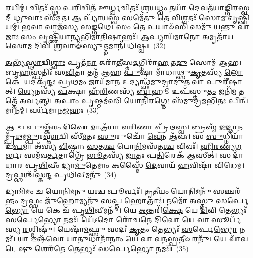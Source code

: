 \-\ul{𑌰}\-𑌯𑌿𑌮𑍍। 𑌚𑌿𑌤𑌃᳴ 𑌸𑍍𑌥 𑌪\-\ul{𑌰𑌿}\-𑌚𑌿𑌤᳴ 𑌊\-\ul{𑌰𑍍𑌧𑍍𑌵}\-𑌚𑌿𑌤𑌃᳴ 𑌶𑍍𑌰𑌯\-\ul{𑌧𑍍𑌵𑌂} 𑌤𑌯𑌾᳴ \ul{𑌦𑍇}\-𑌵𑌤᳴𑌯𑌾𑌙𑍍𑌗𑌿\-\ul{𑌰}\-𑌸𑍍𑌵𑌦𑍍 \ul{𑌧𑍍𑌰𑍁}\-𑌵𑌾𑌃 𑌸𑍀᳴𑌦𑌤। 𑌆 𑌪𑍍𑌯𑌾᳴𑌯\-\ul{𑌸𑍍𑌵} 𑌸𑌮𑍇᳴𑌤𑍁 𑌤𑍇 \ul{𑌵𑌿}\-𑌶𑍍𑌵𑌤𑌃᳴ 𑌸𑍋\-\ul{𑌮} 𑌵𑍃𑌷𑍍𑌣𑌿᳴𑌯𑌮𑍍। 𑌭\-\ul{𑌵𑌾} 𑌵𑌾𑌜᳴𑌸𑍍𑌯 𑌸\-\ul{𑌙𑍍𑌗}\-𑌥𑍇। 𑌸𑌂 \ul{𑌤𑍇} 𑌪𑌯𑌾𑍞᳴\-\ul{𑌸𑌿} 𑌸𑌮𑍁᳴ 𑌯\-\ul{𑌨𑍍𑌤𑍁} 𑌵𑌾\-\ul{𑌜𑌾𑌃} 𑌸𑌂 𑌵𑍃𑌷𑍍𑌣𑌿᳴𑌯𑌾𑌨𑍍𑌯𑌭𑌿𑌮𑌾\-\ul{𑌤𑌿}\-𑌷𑌾𑌹𑌃᳴। \ul{𑌆}\-𑌪𑍍𑌯𑌾𑌯᳴𑌮𑌾𑌨𑍋 \ul{𑌅}\-𑌮𑍃𑌤𑌾᳴𑌯 𑌸𑍋𑌮 \ul{𑌦𑌿}\-𑌵𑌿 𑌶𑍍𑌰𑌵𑌾𑍟᳴𑌸𑍍𑌯𑍁\-\ul{𑌤𑍍𑌤}\-𑌮𑌾𑌨𑌿᳴ 𑌧𑌿𑌷𑍍𑌵॥~(32)

{\anuvakamend[{𑌆 𑌮𑌨𑍍𑌦᳴𑌸𑍍𑌵 𑌸𑌾\-\ul{𑌨}\-𑌸𑌿𑌮𑍇\-\ul{𑌕𑌾}\-𑌨𑍍𑌨𑌚᳴𑌤𑍍𑌵𑌾\-\ul{𑌰𑌿}\-\-\ul{𑍞}\-𑌶𑌚𑍍𑌚᳴}]}%

\-\ul{𑌅}\-𑌭𑍍𑌯᳴\-\ul{𑌸𑍍𑌥𑌾}\-𑌦𑍍𑌵𑌿\-\ul{𑌶𑍍𑌵𑌾𑌃} 𑌪𑍃𑌤᳴\-\ul{𑌨𑌾} 𑌅𑌰𑌾᳴\-\ul{𑌤𑍀}\-𑌸𑍍𑌤\-\ul{𑌦}\-𑌗𑍍𑌨𑌿𑌰𑌾᳴\-\ul{𑌹} 𑌤\-\ul{𑌦𑍁} 𑌸𑍋𑌮᳴ 𑌆𑌹। 𑌬𑍃\-\ul{𑌹}\-𑌸𑍍𑌪𑌤𑌿𑌃᳴ 𑌸\-\ul{𑌵𑌿}\-𑌤𑌾 𑌤𑌨𑍍𑌮᳴ 𑌆𑌹 \ul{𑌪𑍁}\-𑌷𑌾 𑌮𑌾᳴𑌧𑌾𑌥𑍍𑌸𑍁\-\ul{𑌕𑍃}\-𑌤𑌸𑍍𑌯᳴ \ul{𑌲𑍋}\-𑌕𑍇। 𑌯𑌦𑌕𑍍𑌰᳴𑌨𑍍𑌦𑌃 𑌪𑍍𑌰\-\ul{𑌥}\-𑌮𑌂 𑌜𑌾𑌯᳴𑌮𑌾𑌨 \ul{𑌉}\-𑌦𑍍𑌯𑌨𑍍𑌥𑍍𑌸᳴\-\ul{𑌮𑍁}\-𑌦𑍍𑌰𑌾𑌦𑍁𑌤 \ul{𑌵𑌾} 𑌪𑍁𑌰𑍀᳴𑌷𑌾𑌤𑍍। \ul{𑌶𑍍𑌯𑍇}\-𑌨𑌸𑍍𑌯᳴ \ul{𑌪}\-𑌕𑍍𑌷𑌾 𑌹᳴\-\ul{𑌰𑌿}\-𑌣𑌸𑍍𑌯᳴ \ul{𑌬𑌾}\-𑌹𑍂 𑌉𑌪᳴𑌸𑍍𑌤𑍁\-\ul{𑌤𑌂} 𑌜𑌨𑌿᳴\-\ul{𑌮} 𑌤𑌤𑍍𑌤𑍇᳴ 𑌅𑌰𑍍𑌵𑌨𑍍𑌨𑍍। \ul{𑌅}\-𑌪𑌾𑌂 \ul{𑌪𑍃}\-𑌷𑍍𑌠𑌮᳴\-\ul{𑌸𑌿} 𑌯𑍋𑌨𑌿᳴\-\ul{𑌰}\-𑌗𑍍𑌨𑍇𑌃 𑌸᳴\-\ul{𑌮𑍁}\-𑌦𑍍𑌰\-\ul{𑌮}\-𑌭𑌿\-\ul{𑌤𑌃} 𑌪𑌿𑌨𑍍𑌵᳴𑌮𑌾𑌨𑌮𑍍। 𑌵𑌰𑍍𑌧᳴𑌮𑌾𑌨\-\ul{𑌮𑍍𑌮}\-𑌹𑌃~(33)

𑌆 \ul{𑌚} 𑌪𑍁𑌷𑍍𑌕᳴𑌰𑌂 \ul{𑌦𑌿}\-𑌵𑍋 𑌮𑌾𑌤𑍍𑌰᳴𑌯𑌾 \ul{𑌵}\-𑌰𑌿𑌣𑌾 𑌪𑍍𑌰᳴𑌥𑌸𑍍𑌵। 𑌬𑍍𑌰𑌹𑍍𑌮᳴ 𑌜\-\ul{𑌜𑍍𑌞𑌾}\-𑌨𑌮𑍍𑌪𑍍𑌰᳴\-\ul{𑌥}\-𑌮\-\ul{𑌮𑍍𑌪𑍁}\-𑌰\-\ul{𑌸𑍍𑌤𑌾}\-𑌦𑍍𑌵𑌿 𑌸𑍀᳴\-\ul{𑌮}\-𑌤𑌃 \ul{𑌸𑍁}\-𑌰𑍁𑌚𑍋᳴ \ul{𑌵𑍇}\-𑌨 𑌆᳴𑌵𑌃। 𑌸 \ul{𑌬𑍁}\-𑌧𑍍𑌨𑌿𑌯𑌾᳴ 𑌉\-\ul{𑌪}\-𑌮𑌾 𑌅᳴𑌸𑍍𑌯 \ul{𑌵𑌿}\-𑌷𑍍𑌠𑌾𑌃 \ul{𑌸}\-𑌤\-\ul{𑌶𑍍𑌚} 𑌯𑍋\-\ul{𑌨𑌿}\-𑌮𑌸᳴𑌤\-\ul{𑌶𑍍𑌚} 𑌵𑌿𑌵𑌃᳴। \ul{𑌹𑌿}\-\-\ul{𑌰}\-\-\ul{𑌣𑍍𑌯}\-\-\ul{𑌗}\-𑌰𑍍𑌭𑌃 𑌸𑌮᳴𑌵\-\ul{𑌰𑍍𑌤}\-𑌤𑌾𑌗𑍍𑌰𑍇᳴ \ul{𑌭𑍂}\-𑌤𑌸𑍍𑌯᳴ \ul{𑌜𑌾}\-𑌤𑌃 𑌪\-\ul{𑌤𑌿}\-𑌰𑍇𑌕᳴ 𑌆𑌸𑍀𑌤𑍍। 𑌸 𑌦𑌾᳴𑌧𑌾𑌰 𑌪𑍃\-\ul{𑌥𑌿}\-𑌵𑍀𑌂 𑌦𑍍𑌯𑌾\-\ul{𑌮𑍁}\-𑌤𑍇𑌮𑌾𑌂 𑌕𑌸𑍍𑌮𑍈᳴ \ul{𑌦𑍇}\-𑌵𑌾𑌯᳴ \ul{𑌹}\-𑌵𑌿𑌷𑌾᳴ 𑌵𑌿𑌧𑍇𑌮। \ul{𑌦𑍍𑌰}\-𑌫𑍍𑌸𑌶𑍍𑌚᳴𑌸𑍍𑌕𑌨𑍍𑌦 𑌪𑍃\-\ul{𑌥𑌿}\-𑌵𑍀𑌮𑌨𑍁᳴~(34)

𑌦𑍍𑌯𑌾\-\ul{𑌮𑌿}\-𑌮𑌂 \ul{𑌚} 𑌯𑍋\-\ul{𑌨𑌿}\-𑌮\-\ul{𑌨𑍁} 𑌯\-\ul{𑌶𑍍𑌚} 𑌪𑍂𑌰𑍍𑌵𑌃᳴। \ul{𑌤𑍃}\-𑌤𑍀\-\ul{𑌯𑌂} 𑌯𑍋\-\ul{𑌨𑌿}\-𑌮𑌨𑍁᳴ \ul{𑌸}\-𑌞𑍍𑌚𑌰᳴𑌨𑍍𑌤𑌂 \ul{𑌦𑍍𑌰}\-𑌫𑍍𑌸𑌂 𑌜𑍁᳴\-\ul{𑌹𑍋}\-𑌮𑍍𑌯𑌨𑍁᳴ \ul{𑌸}\-𑌪𑍍𑌤 𑌹𑍋𑌤𑍍𑌰𑌾𑌃॑। 𑌨𑌮𑍋᳴ 𑌅𑌸𑍍𑌤𑍁 \ul{𑌸}\-𑌰𑍍𑌪𑍇\-\ul{𑌭𑍍𑌯𑍋} 𑌯𑍇 𑌕𑍇 𑌚᳴ 𑌪𑍃\-\ul{𑌥𑌿}\-𑌵𑍀𑌮𑌨𑍁᳴। 𑌯𑍇 \ul{𑌅}\-𑌨𑍍𑌤𑌰𑌿᳴\-\ul{𑌕𑍍𑌷𑍇} 𑌯𑍇 \ul{𑌦𑌿}\-𑌵𑌿 𑌤𑍇𑌭𑍍𑌯𑌃᳴ \ul{𑌸}\-𑌰𑍍𑌪𑍇\-\ul{𑌭𑍍𑌯𑍋} 𑌨𑌮𑌃᳴। 𑌯𑍇᳴\-𑌽𑌦𑍋 𑌰𑍋᳴\-\ul{𑌚}\-𑌨𑍇 \ul{𑌦𑌿}\-𑌵𑍋 𑌯𑍇 \ul{𑌵𑌾} 𑌸𑍂𑌰𑍍𑌯᳴𑌸𑍍𑌯 \ul{𑌰}\-𑌶𑍍𑌮𑌿𑌷𑍁᳴। 𑌯𑍇𑌷𑌾᳴\-\ul{𑌮}\-𑌫𑍍𑌸𑍁 𑌸𑌦𑌃᳴ \ul{𑌕𑍃}\-𑌤𑌂 𑌤𑍇𑌭𑍍𑌯𑌃᳴ \ul{𑌸}\-𑌰𑍍𑌪𑍇\-\ul{𑌭𑍍𑌯𑍋} 𑌨𑌮𑌃᳴। 𑌯𑌾 𑌇𑌷᳴𑌵𑍋 𑌯𑌾\-\ul{𑌤𑍁}\-𑌧𑌾𑌨𑌾᳴\-\ul{𑌨𑌾𑌂} 𑌯𑍇 \ul{𑌵𑌾} 𑌵\-\ul{𑌨}\-𑌸𑍍𑌪\-\ul{𑌤𑍀}\-\-\ul{𑍞} 𑌰𑌨𑍁᳴। 𑌯𑍇 𑌵𑌾᳴\-\ul{𑌵}\-𑌟𑍇\-\ul{𑌷𑍁} 𑌶𑍇𑌰᳴\-\ul{𑌤𑍇} 𑌤𑍇𑌭𑍍𑌯𑌃᳴ \ul{𑌸}\-𑌰𑍍𑌪𑍇\-\ul{𑌭𑍍𑌯𑍋} 𑌨𑌮𑌃᳴॥~(35)

{\anuvakamend[{\-\ul{𑌮}\-𑌹𑍋\-𑌽𑌨𑍁᳴ 𑌯𑌾\-\ul{𑌤𑍁}\-𑌧𑌾𑌨𑌾᳴\-\ul{𑌨𑌾}\-𑌮𑍇𑌕𑌾᳴\-𑌦𑌶 𑌚}]}%

